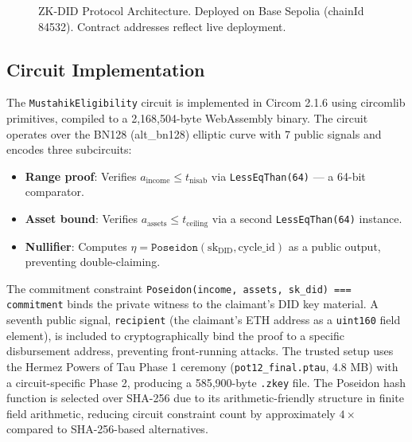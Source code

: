 \documentclass[conference]{IEEEtran}
\begin{document}
\begin{figure}[t]
\caption{ZK-DID Protocol Architecture. Deployed on Base Sepolia (chainId 84532). Contract addresses reflect live deployment.}
\label{fig:architecture}
\end{figure}

\subsection{Circuit Implementation}

The \texttt{MustahikEligibility} circuit is implemented in Circom 2.1.6 using circomlib primitives, compiled to a 2,168,504-byte WebAssembly binary. The circuit operates over the BN128 (alt\_bn128) elliptic curve with 7 public signals and encodes three subcircuits:

\begin{itemize}
    \item \textbf{Range proof}: Verifies $a_{\text{income}} \leq t_{\text{nisab}}$ via \texttt{LessEqThan(64)} — a 64-bit comparator.
    \item \textbf{Asset bound}: Verifies $a_{\text{assets}} \leq t_{\text{ceiling}}$ via a second \texttt{LessEqThan(64)} instance.
    \item \textbf{Nullifier}: Computes $\eta = \texttt{Poseidon}(\text{sk}_{\text{DID}}, \text{cycle\_id})$ as a public output, preventing double-claiming.
\end{itemize}

The commitment constraint \texttt{Poseidon(income, assets, sk\_did) === commitment} binds the private witness to the claimant's DID key material. A seventh public signal, \texttt{recipient} (the claimant's ETH address as a \texttt{uint160} field element), is included to cryptographically bind the proof to a specific disbursement address, preventing front-running attacks. The trusted setup uses the Hermez Powers of Tau Phase 1 ceremony (\texttt{pot12\_final.ptau}, 4.8 MB) with a circuit-specific Phase 2, producing a 585,900-byte \texttt{.zkey} file. The Poseidon hash function \cite{grassi2021} is selected over SHA-256 due to its arithmetic-friendly structure in finite field arithmetic, reducing circuit constraint count by approximately $4\times$ compared to SHA-256-based alternatives.
\end{document}
